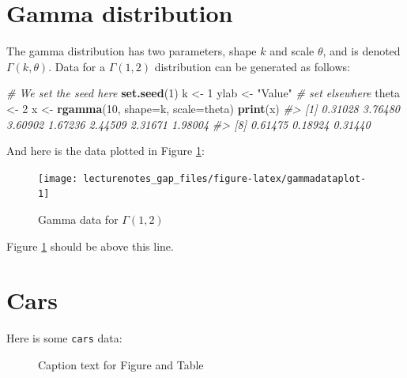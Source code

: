 \documentclass[
]{book}
\newenvironment{Shaded}{\begin{snugshade}}{\end{snugshade}}
\newcommand{\CommentTok}[1]{\textcolor[rgb]{0.56,0.35,0.01}{\textit{#1}}}
\newcommand{\DataTypeTok}[1]{\textcolor[rgb]{0.13,0.29,0.53}{#1}}
\newcommand{\DecValTok}[1]{\textcolor[rgb]{0.00,0.00,0.81}{#1}}
\newcommand{\KeywordTok}[1]{\textcolor[rgb]{0.13,0.29,0.53}{\textbf{#1}}}
\newcommand{\NormalTok}[1]{#1}
\newcommand{\StringTok}[1]{\textcolor[rgb]{0.31,0.60,0.02}{#1}}
\renewcommand{\CommentTok}[1]{\textcolor[rgb]{0.3,0.3,0.3}{\textit{#1}}}
\renewcommand{\DecValTok}[1]{\textcolor[RGB]{229,120,109}{#1}}
\renewcommand{\DecValTok}[1]{\textcolor[RGB]{203,75,22}{#1}}
\begin{document}
\hypertarget{gamma-distribution}{%
\section{Gamma distribution}\label{gamma-distribution}}

The gamma distribution has two parameters, shape \(k\) and scale \(\theta\), and is denoted \(\Gamma(k, \theta)\).
Data for a \(\Gamma(1, 2)\) distribution can be generated as follows:

\begin{Shaded}
\begin{Highlighting}[]
\CommentTok{# We set the seed here}
\KeywordTok{set.seed}\NormalTok{(}\DecValTok{1}\NormalTok{)}
\NormalTok{k <-}\StringTok{ }\DecValTok{1}
\NormalTok{ylab <-}\StringTok{  "Value"} \CommentTok{# set elsewhere}
\NormalTok{theta <-}\StringTok{ }\DecValTok{2}
\NormalTok{x <-}\StringTok{ }\KeywordTok{rgamma}\NormalTok{(}\DecValTok{10}\NormalTok{, }\DataTypeTok{shape=}\NormalTok{k, }\DataTypeTok{scale=}\NormalTok{theta)}
\KeywordTok{print}\NormalTok{(x)}
\CommentTok{#>  [1] 0.31028 3.76480 3.60902 1.67236 2.44509 2.31671 1.98004}
\CommentTok{#>  [8] 0.61475 0.18924 0.31440}
\end{Highlighting}
\end{Shaded}

And here is the data plotted in Figure \ref{fig:gammadataplot}:

\begin{figure}[H]

{\centering \texttt{[image: lecturenotes\_gap\_files/figure-latex/gammadataplot-1]} 

}

\caption{Gamma data for $\Gamma(1, 2)$}\label{fig:gammadataplot}
\end{figure}

Figure \ref{fig:gammadataplot} should be above this line.

\clearpage

\hypertarget{cars}{%
\section{Cars}\label{cars}}

Here is some \texttt{cars} data:

\begin{figure}[H]

{\centering {}

}

\caption{Caption text for Figure and Table}\label{fig:carsfigureandtable}
\end{figure}
\end{document}
